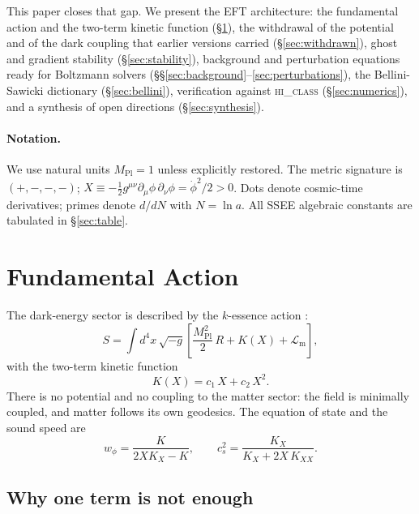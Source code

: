 \documentclass[12pt,a4paper]{article}
\newcommand{\Mpl}{M_{\mathrm{Pl}}}
\newcommand{\half}{\tfrac{1}{2}}
\begin{document}
This paper closes that gap.  We present the EFT architecture:
the fundamental action and the two-term kinetic function
(§\ref{sec:action}), the withdrawal of the potential and of the dark
coupling that earlier versions carried (§\ref{sec:withdrawn}), ghost
and gradient stability (§\ref{sec:stability}), background and
perturbation equations ready for Boltzmann solvers
(§§\ref{sec:background}--\ref{sec:perturbations}),
the Bellini-Sawicki dictionary (§\ref{sec:bellini}), verification
against \textsc{hi\_class} (§\ref{sec:numerics}), and a synthesis of
open directions (§\ref{sec:synthesis}).

\paragraph{Notation.}
We use natural units $\Mpl = 1$ unless explicitly restored.
The metric signature is $(+,-,-,-)$; $X \equiv -\half g^{\mu\nu}
\partial_\mu\phi\,\partial_\nu\phi = \dot\phi^2/2 > 0$.
Dots denote cosmic-time derivatives; primes denote $d/dN$ with
$N = \ln a$.  All SSEE algebraic constants are tabulated in §\ref{sec:table}.

\section{Fundamental Action}
\label{sec:action}

The dark-energy sector is described by the $k$-essence action
\citep{ArmendarizPicon2001}:
%
\begin{equation}
  S = \int d^{4}x\,\sqrt{-g}
      \left[\frac{\Mpl^{2}}{2}\,R
            + K(X)
            + \mathcal{L}_{\mathrm{m}}
      \right],
  \label{eq:accion}
\end{equation}
%
with the two-term kinetic function
%
\begin{equation}
  K(X) = c_1\,X + c_2\,X^{2}.
  \label{eq:KX}
\end{equation}
%
There is no potential and no coupling to the matter sector: the field is
minimally coupled, and matter follows its own geodesics.
The equation of state and the sound speed are
%
\begin{equation}
  w_\phi = \frac{K}{2XK_X - K},
  \qquad
  c_s^{2} = \frac{K_X}{K_X + 2X\,K_{XX}}.
  \label{eq:cs2}
\end{equation}

\subsection{Why one term is not enough}
\end{document}
